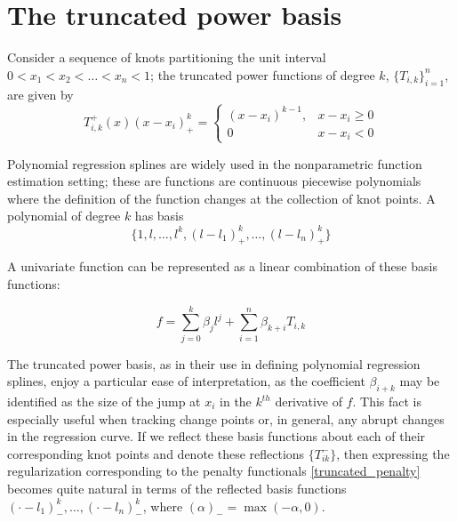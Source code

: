\documentclass[12pt]{article}
\begin{document}
\section{The truncated power basis}
Consider a sequence of knots partitioning the unit interval $0 < x_1 < x_2 < \dots <x_n < 1$; the truncated power functions of degree $k$, $\lbrace T_{i,k} \rbrace_{i=1}^n$, are given by
\[
T^+_{i,k}\left(x\right) \left(x - x_i\right)^{k}_+ = \left\{\begin{array}{lr} \left(x-x_i\right)^{k-1}, & x-x_i \ge0\\ 0 & x-x_i < 0\end{array}\right.
\]

Polynomial regression splines are widely used in the nonparametric function estimation setting; these are functions are continuous piecewise polynomials where the definition of the function changes at the collection of knot points. A polynomial of degree $k$ has basis
\[
\lbrace 1,l,\dots,l^k, \left(l - l_1\right)^{k}_+,\dots, \left(l - l_n\right)^{k}_+ \rbrace
\]

A univariate function can be represented as a linear combination of these basis functions: 

\[
f = \sum_{j=0}^k \beta_j l^j + \sum_{i=1}^n \beta_{k+i} T_{i,k}
\]
\noindent

The truncated power basis, as in their use in defining polynomial regression splines, enjoy a particular ease of interpretation, as the coefficient $\beta_{i+k}$ may be identified as the size of the jump at $x_i$ in the $k^{th}$ derivative of $f$. This fact is especially useful when tracking change points or, in general, any abrupt changes in the regression curve. If we reflect these basis functions about each of their corresponding knot points and denote these reflections $\lbrace T^-_{ik}\rbrace$, then expressing the regularization corresponding to the penalty functionals \eqref{truncated_penalty} becomes quite natural in terms of the reflected basis functions $\left(\cdot - l_1 \right)^k_-,\dots, \left(\cdot - l_n \right)^k_-$, where $\left( \alpha \right)_- = \max\left(-\alpha,0\right)$.
\end{document}
